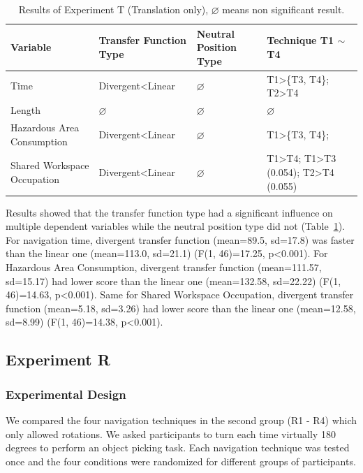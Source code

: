 \begin{table}[hbt]
\renewcommand{\arraystretch}{1.3}
\caption{Results of Experiment T (Translation only), $\varnothing$ means non significant result.}
\label{tab:4_result_t1}
\centering
\small
\begin{tabular}{p{3cm} l l p{4.5cm}}
  \hline
  Variable & Transfer Function Type & Neutral Position Type & Technique T1 $\sim$ T4 \\
  \hline
  Time & Divergent\textless Linear & $\varnothing$ & T1\textgreater \{T3, T4\}; T2\textgreater T4 \\
  Length & $\varnothing$ & $\varnothing$ & $\varnothing$ \\
  Hazardous Area Consumption & Divergent\textless Linear & $\varnothing$ & T1\textgreater \{T3, T4\}; \\
  Shared Workspace Occupation & Divergent\textless Linear & $\varnothing$ & T1\textgreater T4; T1\textgreater T3 (0.054); T2\textgreater T4 (0.055) \\
  \hline
\end{tabular}
\end{table}

Results showed that the transfer function type had a significant influence on multiple dependent variables while the neutral position type did not (Table~\ref{tab:4_result_t1}). For navigation time, divergent transfer function (mean=89.5, sd=17.8) was faster than the linear one (mean=113.0, sd=21.1) (F(1, 46)=17.25, p\textless 0.001). For Hazardous Area Consumption, divergent transfer function (mean=111.57, sd=15.17) had lower score than the linear one (mean=132.58, sd=22.22) (F(1, 46)=14.63, p\textless 0.001). Same for Shared Workspace Occupation, divergent transfer function (mean=5.18, sd=3.26) had lower score than the linear one (mean=12.58, sd=8.99) (F(1, 46)=14.38, p\textless 0.001).


\subsection{Experiment R}
\subsubsection{Experimental Design}
We compared the four navigation techniques in the second group (R1 - R4) which only allowed rotations. We asked participants to turn each time virtually 180 degrees to perform an object picking task. Each navigation technique was tested once and the four conditions were randomized for different groups of participants.

